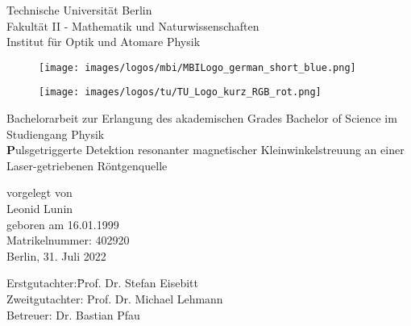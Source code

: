 \begin{titlepage}	
\noindent
\begin{minipage}{0.5\textwidth}
{\small
Technische Universit\"at Berlin\\
Fakult\"at II - Mathematik und Naturwissenschaften\\
Institut für Optik und Atomare Physik\\
}%
\end{minipage}%
\hfill
\begin{minipage}{0.18\textwidth}
\begin{figure}[H]%
\texttt{[image: images/logos/mbi/MBILogo\_german\_short\_blue.png]}
\end{figure}
\end{minipage}%
\hspace{5mm}
\begin{minipage}{0.18\textwidth}
\begin{figure}[H]%
\texttt{[image: images/logos/tu/TU\_Logo\_kurz\_RGB\_rot.png]}
\end{figure}
\end{minipage}%

\vspace{2cm}

\thispagestyle{empty}
\begin{center}

{\large Bachelorarbeit zur Erlangung des akademischen Grades
Bachelor of Science
im Studiengang Physik}\\
\vspace{1cm}
{\huge\textbf
Pulsgetriggerte Detektion resonanter magnetischer Kleinwinkelstreuung an einer Laser-getriebenen Röntgenquelle}
\vspace{1.2cm}

{\large vorgelegt von\\
	 Leonid Lunin \\
	 geboren am 16.01.1999\\
	 Matrikelnummer: 402920\\[2cm]
	 Berlin, 31. Juli 2022\\[2cm]
}

\begin{minipage}{\linewidth} 
\begin{tabbing}
  		Erstgutachter:\quad \= Prof. Dr. Stefan Eisebitt\\[0.3cm]
  		Zweitgutachter: \> Prof. Dr. Michael Lehmann\\[0.3cm]
    	Betreuer:             \> Dr. Bastian Pfau \\
    						         
\end{tabbing}
\end{minipage}

\vspace{1.5cm}

\end{center}
\thispagestyle{empty}
\newpage
\setcounter{page}{1}
\end{titlepage}

\shipout\null
